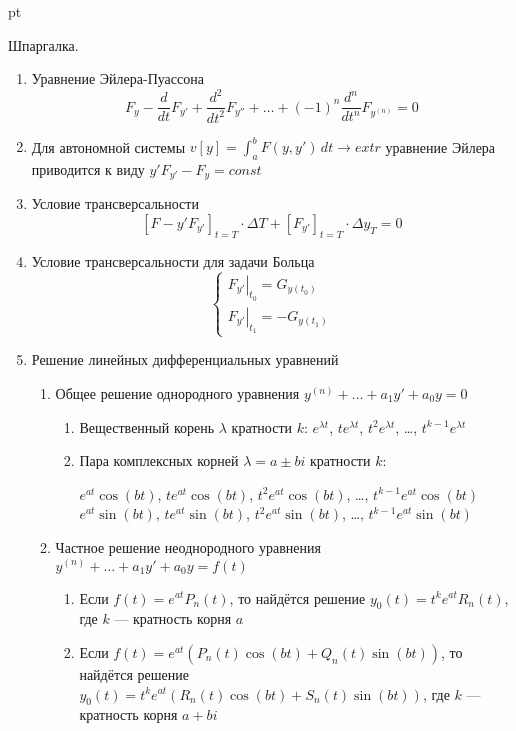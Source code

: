 \documentclass[pdftex,12pt,a4paper]{article}
\begin{document}
 pt %

Шпаргалка.

\begin{enumerate}
\item Уравнение Эйлера-Пуассона
\[
F_y-\frac{d}{dt}F_{y'}+\frac{d^2}{dt^2}F_{y''}+\ldots+(-1)^n\frac{d^n}{dt^n}F_{y^{(n)}}=0
\]

\item Для автономной системы $v[y]=\int_a^b F(y,y')\, dt \to extr$ уравнение Эйлера приводится к виду $y'F_{y'}-F_y=const$

\item Условие трансверсальности 
\[
[F-y'F_{y'}]_{t=T}\cdot \Delta T + [F_{y'}]_{t=T}\cdot \Delta y_T=0
\]

\item Условие трансверсальности для задачи Больца
\[
\begin{cases}
\left. F_{y'}\right|_{t_0}=G_{y(t_0)} \\
\left. F_{y'}\right|_{t_1}=-G_{y(t_1)}
\end{cases}
\]

\item Решение линейных дифференциальных уравнений

\begin{enumerate}
\item Общее решение однородного уравнения $y^{(n)}+\ldots+a_1 y'+a_0 y=0$
\begin{enumerate}
\item Вещественный корень $\lambda$ кратности $k$: $e^{\lambda t}$, $te^{\lambda t}$, $t^2e^{\lambda t}$, \ldots, $t^{k-1}e^{\lambda t}$
\item Пара комплексных корней $\lambda=a\pm bi$  кратности $k$:

$e^{at}\cos(bt)$, $te^{at}\cos(bt)$, $t^2e^{at}\cos(bt)$, \ldots, $t^{k-1}e^{at}\cos(bt)$ \\
$e^{at}\sin(bt)$, $te^{at}\sin(bt)$, $t^2e^{at}\sin(bt)$, \ldots, $t^{k-1}e^{at}\sin(bt)$
\end{enumerate}
\item Частное решение неоднородного уравнения $y^{(n)}+\ldots+a_1 y'+a_0 y=f(t)$
\begin{enumerate}
\item Если $f(t)=e^{at}P_n(t)$, то найдётся решение $y_0(t)=t^k e^{at} R_n(t)$, где $k$ --- кратность корня $a$
\item Если $f(t)=e^{at}(P_n(t)\cos(bt)+Q_n(t)\sin(bt))$, то найдётся решение $y_0(t)=t^k e^{at}(R_n(t)\cos(bt)+S_n(t)\sin(bt))$, где $k$ --- кратность корня $a+bi$
\end{enumerate}
\end{enumerate}

\end{enumerate}
\end{document}
